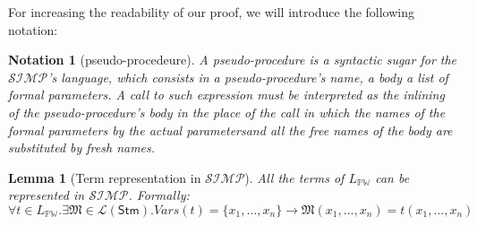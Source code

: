 \documentclass[10pt]{amsart}
\newcommand{\Wl}{\mathbb{PW}}
\newcommand{\SIMP}{\mathcal{SIMP}}
\newcommand{\vone}{x}
\newcommand{\lang}[1]{\mathcal L(#1)}
\newcommand{\stm}{\mathsf{Stm}}
\newcommand{\MM}{\mathfrak M}
\newtheorem{lemma}{Lemma}
\newtheorem{notation}{Notation}
\begin{document}
For increasing the readability of our proof, we will introduce the following notation:

\begin{notation}[pseudo-procedeure]
A pseudo-procedure is a syntactic sugar for the $\SIMP$'s language, which consists in a \emph{pseudo-procedure's name}, a \emph{body} a list of \emph{formal parameters}. A call to such expression must be interpreted as the inlining of the pseudo-procedure's body in the place of the call in which the names of the formal parameters by the actual parametersand all the \emph{free} names of the body are substituted by fresh names.
\end{notation}


\begin{lemma}[Term representation in $\SIMP$]
All the terms of $L_\Wl$ can be represented in $\SIMP$. Formally: $\forall t \in L_\Wl. \exists \MM\in \lang{\stm}. Vars(t)=\{\vone_1, \ldots, \vone_n\} \to \MM(\vone_1, \ldots, \vone_n)= t(\vone_1, \ldots, \vone_n)$
\end{lemma}
\end{document}
